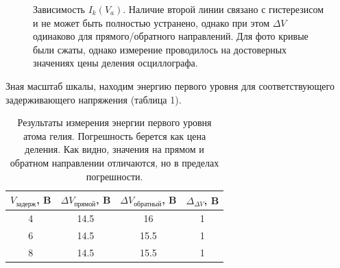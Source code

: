 \documentclass[a4paper, 14pt]{extarticle}%
\newcommand\ECaption[1]{%
     \captionsetup{font=footnotesize}%
     \caption{#1}}
\begin{document}
\begin{figure}[h]
\begin{minipage}[h]{0.32\linewidth}
\end{minipage}
\hfill
\begin{minipage}[h]{0.32\linewidth}
\end{minipage}
\ECaption{Зависимость $I_k(V_a)$. Наличие второй линии связано с гистерезисом и не может быть полностью устранено, однако при этом $\Delta V$ одинаково для прямого/обратного направлений. Для фото кривые были сжаты, однако измерение проводилось на достоверных значениях цены деления осциллографа.}
\end{figure}


Зная масштаб шкалы, находим энергию первого уровня для соответствующего задерживающего напряжения (таблица 1).
\begin{table}[h!]
\begin{center}
\begin{tabular}{|c|c|c|c|}
\hline
\rowcolor[HTML]{9698ED} 
$V_{\text{задерж}}$, B & $\Delta V_{\text{прямой}}$, B & $\Delta V_{\text{обратный}}$, B & $\Delta_{\Delta V}$, B \\ \hline
4                      & 14.5                          & 16                              & 1                      \\ \hline
\rowcolor[HTML]{9698ED} 
6                      & 14.5                          & 15.5                            & 1                      \\ \hline
8                      & 14.5                          & 15.5                            & 1                      \\ \hline
\end{tabular}
\ECaption{Результаты измерения энергии первого уровня атома гелия. Погрешность берется как цена деления. Как видно, значения на прямом и обратном направлении отличаются, но в пределах погрешности.}
\end{center}
\end{table}
\end{document}
